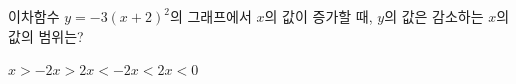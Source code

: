 이차함수 $y=-3(x+2)^2$의 그래프에서 $x$의 값이 증가할 때, $y$의 값은 감소하는 $x$의 값의 범위는?
\begin{choices32}{$x>-2$}{$x>2$}{$x<-2$}{$x<2$}{$x<0$}\end{choices32}
